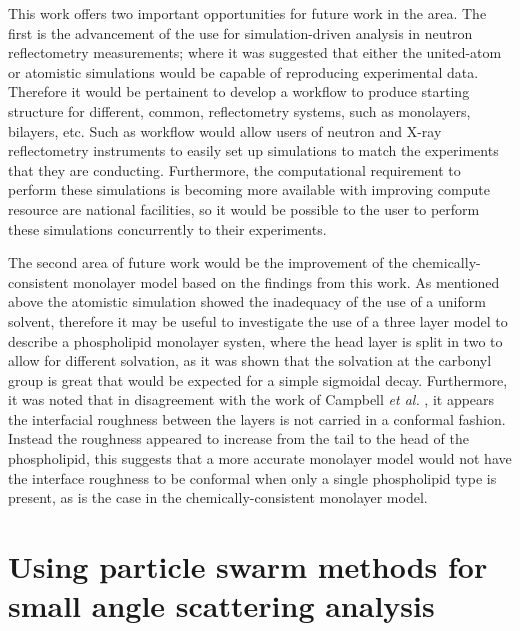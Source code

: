 This work offers two important opportunities for future work in the area.
The first is the advancement of the use for simulation-driven analysis in neutron reflectometry measurements; where it was suggested that either the united-atom or atomistic simulations would be capable of reproducing experimental data.
Therefore it would be pertainent to develop a workflow to produce starting structure for different, common, reflectometry systems, such as monolayers, bilayers, etc.
Such as workflow would allow users of neutron and X-ray reflectometry instruments to easily set up simulations to match the experiments that they are conducting.
Furthermore, the computational requirement to perform these simulations is becoming more available with improving compute resource are national facilities, so it would be possible to the user to perform these simulations concurrently to their experiments.

The second area of future work would be the improvement of the chemically-consistent monolayer model based on the findings from this work.
As mentioned above the atomistic simulation showed the inadequacy of the use of a uniform solvent, therefore it may be useful to investigate the use of a three layer model to describe a phospholipid monolayer systen, where the head layer is split in two to allow for different solvation, as it was shown that the solvation at the carbonyl group is great that would be expected for a simple sigmoidal decay.
Furthermore, it was noted that in disagreement with the work of Campbell \emph{et al.} \cite{campbell_structure_2018}, it appears the interfacial roughness between the layers is not carried in a conformal fashion.
Instead the roughness appeared to increase from the tail to the head of the phospholipid, this suggests that a more accurate monolayer model would not have the interface roughness to be conformal when only a single phospholipid type is present, as is the case in the chemically-consistent monolayer model.

\section{Using particle swarm methods for small angle scattering analysis}

